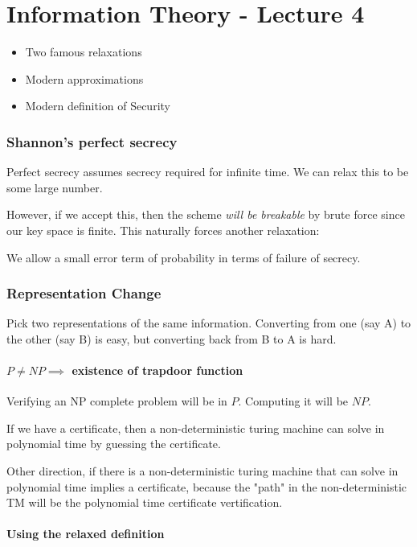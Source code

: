 \chapter{Information Theory - Lecture 4}

\begin{itemize}
    \item Two famous relaxations
    \item Modern approximations
    \item Modern definition of Security
\end{itemize}

\subsection{Shannon's perfect secrecy}
Perfect secrecy assumes secrecy required for infinite time. We can relax 
this to be some large number.

However, if we accept this, then the scheme \textit{will be breakable} by brute force
since our key space is finite. This naturally forces another relaxation:

We allow a small error term of probability in terms of failure of secrecy.



\subsection{Representation Change}

Pick two representations of the same information. Converting from one (say A)
to the other (say B) is easy, but converting back from B to A is hard.

\subsubsection{$P \neq NP \implies$ existence of trapdoor function}

Verifying an NP complete problem will be in $P$. Computing it will be $NP$.


If we have a certificate, then a non-deterministic turing machine can solve in
polynomial time by guessing the certificate.

Other direction, if there is a non-deterministic turing machine that can solve
in polynomial time implies a certificate, because the "path" in the
non-deterministic TM will be the polynomial time certificate vertification.

\subsubsection{Using the relaxed definition}

